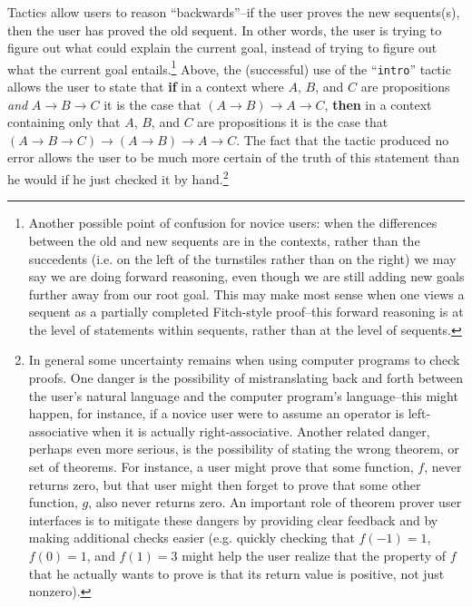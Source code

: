 \documentclass[11pt]{amsart}
\newcommand{\ra}{\ensuremath{\rightarrow}}
\begin{document}
Tactics allow users to reason ``backwards''--if the user proves the new sequents(s), then the user has proved the old sequent.  In other words, the user is trying to figure out what could explain the current goal, instead of trying to figure out what the current goal entails.\footnote{Another possible point of confusion for novice users:  when the differences between the old and new sequents are in the contexts, rather than the succedents (i.e. on the left of the turnstiles rather than on the right) we may say we are doing forward reasoning, even though we are still adding new goals further away from our root goal.  This may make most sense when one views a sequent as a partially completed Fitch-style proof--this forward reasoning is at the level of statements within sequents, rather than at the level of sequents.}  Above, the (successful) use of the ``\texttt{intro}'' tactic allows the user to state that {\bf if} in a context where $A$, $B$, and $C$ are propositions \textit{and} $A \ra B \ra C$ it is the case that $(A \ra B) \ra A \ra C$, {\bf then} in a context containing only that $A$, $B$, and $C$ are propositions it is the case that $(A \ra B \ra C) \ra (A \ra B) \ra A \ra C$.  The fact that the tactic produced no error allows the user to be much more certain of the truth of this statement than he would if he just checked it by hand.\footnote{In general some uncertainty remains when using computer programs to check proofs. One danger is the possibility of mistranslating back and forth between the user's natural language and the computer program's language--this might happen, for instance, if a novice user were to assume an operator is left-associative when it is actually right-associative.  Another related danger, perhaps even more serious, is the possibility of stating the wrong theorem, or set of theorems.  For instance, a user might prove that some function, $f$, never returns zero, but that user might then forget to prove that some other function, $g$, also never returns zero.  An important role of theorem prover user interfaces is to mitigate these dangers by providing clear feedback and by making additional checks easier (e.g. quickly checking that $f(-1) = 1$, $f(0) = 1$, and $f(1) = 3$ might help the user realize that the property of $f$ that he actually wants to prove is that its return value is positive, not just nonzero).}

\end{document}
